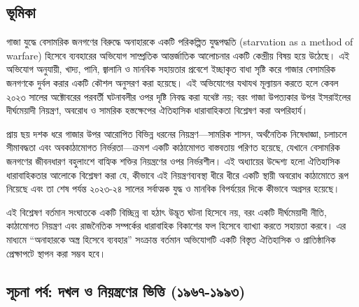 \subsection{\texorpdfstring{ ভূমিকা }{২.১ ভূমিকা }}\label{ux9adux9aeux995}

গাজা যুদ্ধে বেসামরিক জনগণের বিরুদ্ধে অনাহারকে একটি পরিকল্পিত যুদ্ধপদ্ধতি (starvation as a method of warfare) হিসেবে ব্যবহারের অভিযোগ সাম্প্রতিক আন্তর্জাতিক আলোচনার একটি কেন্দ্রীয় বিষয় হয়ে উঠেছে। এই অভিযোগ অনুযায়ী, খাদ্য, পানি, জ্বালানি ও মানবিক সহায়তার প্রবেশে ইচ্ছাকৃত বাধা সৃষ্টি করে গাজার বেসামরিক জনগণকে দুর্বল করার একটি কৌশল অনুসরণ করা হয়েছে। এই অভিযোগের যথাযথ মূল্যায়ন করতে হলে কেবল ২০২৩ সালের অক্টোবরের পরবর্তী ঘটনাবলীর ওপর দৃষ্টি নিবদ্ধ করা যথেষ্ট নয়; বরং গাজা উপত্যকার উপর ইসরাইলের দীর্ঘমেয়াদী নিয়ন্ত্রণ, অবরোধ ও সামরিক হস্তক্ষেপের ঐতিহাসিক ধারাবাহিকতা বিশ্লেষণ করা অপরিহার্য।

প্রায় ছয় দশক ধরে গাজার উপর আরোপিত বিভিন্ন ধরনের নিয়ন্ত্রণ---সামরিক শাসন, অর্থনৈতিক নিষেধাজ্ঞা, চলাচলে সীমাবদ্ধতা এবং অবকাঠামোগত নির্ভরতা---ক্রমশ একটি কাঠামোগত বাস্তবতায় পরিণত হয়েছে, যেখানে বেসামরিক জনগণের জীবনধারণ বহুলাংশে বাহ্যিক শক্তির নিয়ন্ত্রণের ওপর নির্ভরশীল। এই অধ্যায়ের উদ্দেশ্য হলো ঐতিহাসিক ধারাবাহিকতার আলোকে বিশ্লেষণ করা যে, কীভাবে এই নিয়ন্ত্রণব্যবস্থা ধীরে ধীরে একটি স্থায়ী অবরোধ কাঠামোতে রূপ নিয়েছে এবং তা শেষ পর্যন্ত ২০২৩-২৪ সালের সর্বাত্মক যুদ্ধ ও মানবিক বিপর্যয়ের দিকে কীভাবে অগ্রসর হয়েছে।

এই বিশ্লেষণ বর্তমান সংঘাতকে একটি বিচ্ছিন্ন বা হঠাৎ উদ্ভূত ঘটনা হিসেবে নয়, বরং একটি দীর্ঘমেয়াদী নীতি, কাঠামোগত নিয়ন্ত্রণ এবং রাজনৈতিক সম্পর্কের ধারাবাহিক বিকাশের ফল হিসেবে ব্যাখ্যা করতে সহায়তা করবে। এর মাধ্যমে ``অনাহারকে অস্ত্র হিসেবে ব্যবহার'' সংক্রান্ত বর্তমান অভিযোগটি একটি বিস্তৃত ঐতিহাসিক ও প্রাতিষ্ঠানিক প্রেক্ষাপটে স্থাপন করা সম্ভব হবে।

\subsection{সূচনা পর্ব: দখল ও নিয়ন্ত্রণের ভিত্তি (১৯৬৭-১৯৯৩)}\label{ux9b8ux99aux9a8-ux9aaux9b0ux9ac-ux9a6ux996ux9b2-ux993-ux9a8ux9afux9a8ux9a4ux9b0ux9a3ux9b0-ux9adux9a4ux9a4-ux9e7ux9efux9ecux9ed-ux9e7ux9efux9efux9e9}

